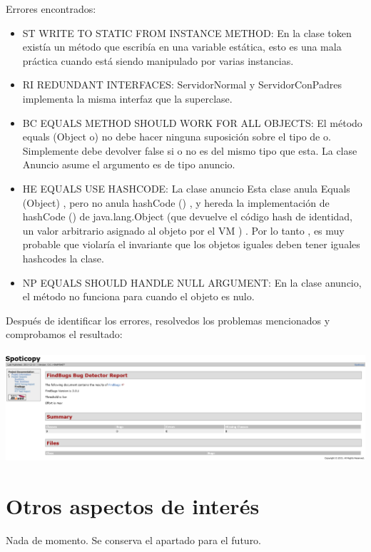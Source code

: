 \documentclass[12pt, a4paper, titlepage]{article}
\begin{document}
	Errores encontrados:
	\begin{itemize}
		\item 	ST WRITE TO STATIC FROM INSTANCE METHOD: En la clase token existía un método que escribía en una variable estática, esto es una mala práctica cuando está siendo manipulado por varias instancias.
		\item 	RI REDUNDANT INTERFACES: ServidorNormal y ServidorConPadres implementa la misma interfaz que la superclase.
		\item BC EQUALS METHOD SHOULD WORK FOR ALL OBJECTS: El método equals (Object o) no debe hacer ninguna suposición sobre el tipo de o. Simplemente debe devolver false si o no es del mismo tipo que esta. La clase Anuncio asume el argumento es de tipo anuncio.
		\item HE EQUALS USE HASHCODE: La clase anuncio Esta clase anula Equals (Object) , pero no anula hashCode () , y hereda la implementación de hashCode () de java.lang.Object (que devuelve el código hash de identidad, un valor arbitrario asignado al objeto por el VM ) . Por lo tanto , es muy probable que violaría el invariante que los objetos iguales deben tener iguales hashcodes la clase.
		\item NP EQUALS SHOULD HANDLE NULL ARGUMENT: En la clase anuncio, el método no funciona para cuando el objeto es nulo.	
	\end{itemize}
	Después de identificar los errores, resolvedos los problemas mencionados y comprobamos el resultado:\\
	\\
	\includegraphics[width=15cm]{Imagenes/FindsBugs2.png} \\

	\section{Otros aspectos de interés}
	
	Nada de momento. Se conserva el apartado para el futuro.
	
\end{document}
